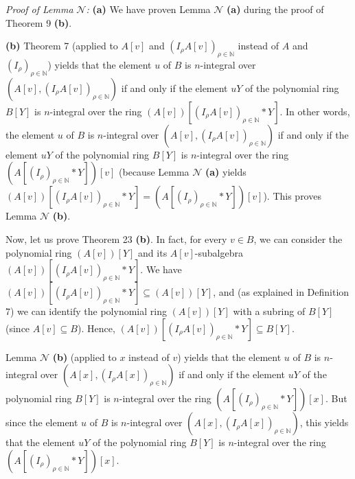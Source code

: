 \documentclass[12pt,final,notitlepage,onecolumn]{article}%
\begin{document}
\textit{Proof of Lemma }$\mathcal{N}$\textit{:} \textbf{(a)} We have proven
Lemma $\mathcal{N}$ \textbf{(a)} during the proof of Theorem 9 \textbf{(b)}.

\textbf{(b)} Theorem 7 (applied to $A\left[  v\right]  $ and $\left(  I_{\rho
}A\left[  v\right]  \right)  _{\rho\in\mathbb{N}}$ instead of $A$ and $\left(
I_{\rho}\right)  _{\rho\in\mathbb{N}}$) yields that the element $u$ of $B$ is
$n$-integral over $\left(  A\left[  v\right]  ,\left(  I_{\rho}A\left[
v\right]  \right)  _{\rho\in\mathbb{N}}\right)  $ if and only if the element
$uY$ of the polynomial ring $B\left[  Y\right]  $ is $n$-integral over the
ring $\left(  A\left[  v\right]  \right)  \left[  \left(  I_{\rho}A\left[
v\right]  \right)  _{\rho\in\mathbb{N}}\ast Y\right]  $. In other words, the
element $u$ of $B$ is $n$-integral over $\left(  A\left[  v\right]  ,\left(
I_{\rho}A\left[  v\right]  \right)  _{\rho\in\mathbb{N}}\right)  $ if and only
if the element $uY$ of the polynomial ring $B\left[  Y\right]  $ is
$n$-integral over the ring $\left(  A\left[  \left(  I_{\rho}\right)
_{\rho\in\mathbb{N}}\ast Y\right]  \right)  \left[  v\right]  $ (because Lemma
$\mathcal{N}$ \textbf{(a)} yields $\left(  A\left[  v\right]  \right)  \left[
\left(  I_{\rho}A\left[  v\right]  \right)  _{\rho\in\mathbb{N}}\ast Y\right]
=\left(  A\left[  \left(  I_{\rho}\right)  _{\rho\in\mathbb{N}}\ast Y\right]
\right)  \left[  v\right]  $). This proves Lemma $\mathcal{N}$ \textbf{(b)}.

Now, let us prove Theorem 23 \textbf{(b)}. In fact, for every $v\in B$, we can
consider the polynomial ring $\left(  A\left[  v\right]  \right)  \left[
Y\right]  $ and its $A\left[  v\right]  $-subalgebra $\left(  A\left[
v\right]  \right)  \left[  \left(  I_{\rho}A\left[  v\right]  \right)
_{\rho\in\mathbb{N}}\ast Y\right]  $. We have $\left(  A\left[  v\right]
\right)  \left[  \left(  I_{\rho}A\left[  v\right]  \right)  _{\rho
\in\mathbb{N}}\ast Y\right]  \subseteq\left(  A\left[  v\right]  \right)
\left[  Y\right]  $, and (as explained in Definition 7) we can identify the
polynomial ring $\left(  A\left[  v\right]  \right)  \left[  Y\right]  $ with
a subring of $B\left[  Y\right]  $ (since $A\left[  v\right]  \subseteq B$).
Hence, $\left(  A\left[  v\right]  \right)  \left[  \left(  I_{\rho}A\left[
v\right]  \right)  _{\rho\in\mathbb{N}}\ast Y\right]  \subseteq B\left[
Y\right]  $.

Lemma $\mathcal{N}$ \textbf{(b)} (applied to $x$ instead of $v$) yields that
the element $u$ of $B$ is $n$-integral over $\left(  A\left[  x\right]
,\left(  I_{\rho}A\left[  x\right]  \right)  _{\rho\in\mathbb{N}}\right)  $ if
and only if the element $uY$ of the polynomial ring $B\left[  Y\right]  $ is
$n$-integral over the ring $\left(  A\left[  \left(  I_{\rho}\right)
_{\rho\in\mathbb{N}}\ast Y\right]  \right)  \left[  x\right]  $. But since the
element $u$ of $B$ is $n$-integral over $\left(  A\left[  x\right]  ,\left(
I_{\rho}A\left[  x\right]  \right)  _{\rho\in\mathbb{N}}\right)  $, this
yields that the element $uY$ of the polynomial ring $B\left[  Y\right]  $ is
$n$-integral over the ring $\left(  A\left[  \left(  I_{\rho}\right)
_{\rho\in\mathbb{N}}\ast Y\right]  \right)  \left[  x\right]  $.
\end{document}
